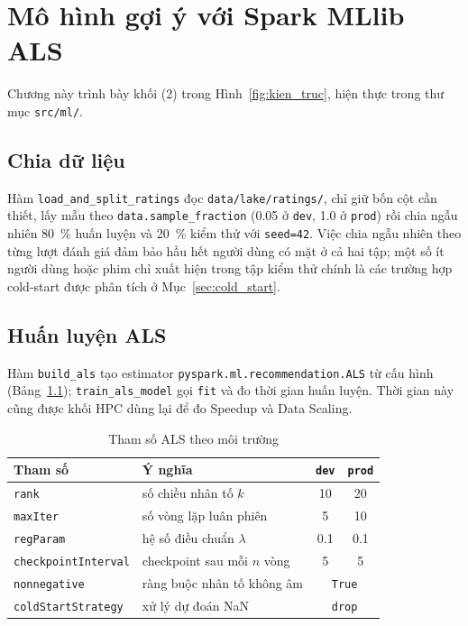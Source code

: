 \chapter{Mô hình gợi ý với Spark MLlib ALS}
\label{chap:mo_hinh}

Chương này trình bày khối (2) trong Hình~\ref{fig:kien_truc}, hiện thực trong thư mục \texttt{src/ml/}.

\section{Chia dữ liệu}
\label{sec:chia_du_lieu}
Hàm \texttt{load\_and\_split\_ratings} đọc \texttt{data/lake/ratings/}, chỉ giữ bốn cột cần thiết, lấy mẫu theo \texttt{data.sample\_fraction} (\num{0,05} ở \texttt{dev}, \num{1,0} ở \texttt{prod}) rồi chia ngẫu nhiên \SI{80}{\percent} huấn luyện và \SI{20}{\percent} kiểm thử với \texttt{seed=42}. Việc chia ngẫu nhiên theo từng lượt đánh giá đảm bảo hầu hết người dùng có mặt ở cả hai tập; một số ít người dùng hoặc phim chỉ xuất hiện trong tập kiểm thử chính là các trường hợp cold-start được phân tích ở Mục~\ref{sec:cold_start}.

\section{Huấn luyện ALS}
\label{sec:huan_luyen}
Hàm \texttt{build\_als} tạo estimator \texttt{pyspark.ml.recommendation.ALS} từ cấu hình (Bảng~\ref{tab:als_params}); \texttt{train\_als\_model} gọi \texttt{fit} và đo thời gian huấn luyện. Thời gian này cũng được khối HPC dùng lại để đo Speedup và Data Scaling.

\begin{table}[H]
\centering
\caption{Tham số ALS theo môi trường}
\label{tab:als_params}
\begin{tabular}{l l c c}
\toprule
\textbf{Tham số} & \textbf{Ý nghĩa} & \texttt{dev} & \texttt{prod} \\
\midrule
\texttt{rank} & số chiều nhân tố $k$ & \num{10} & \num{20} \\
\texttt{maxIter} & số vòng lặp luân phiên & \num{5} & \num{10} \\
\texttt{regParam} & hệ số điều chuẩn $\lambda$ & \num{0,1} & \num{0,1} \\
\texttt{checkpointInterval} & checkpoint sau mỗi $n$ vòng & \num{5} & \num{5} \\
\texttt{nonnegative} & ràng buộc nhân tố không âm & \multicolumn{2}{c}{\texttt{True}} \\
\texttt{coldStartStrategy} & xử lý dự đoán NaN & \multicolumn{2}{c}{\texttt{drop}} \\
\bottomrule
\end{tabular}
\end{table}

